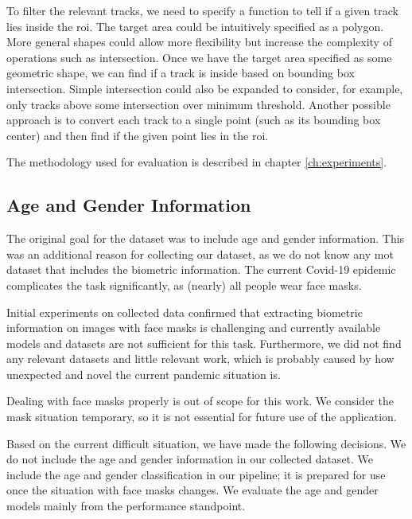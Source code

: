 To filter the relevant tracks, we need to specify a function to tell if a given track lies inside the \gls{roi}. The target area could be intuitively specified as a polygon. More general shapes could allow more flexibility but increase the complexity of operations such as intersection. Once we have the target area specified as some geometric shape, we can find if a track is inside based on bounding box intersection. Simple intersection could also be expanded to consider, for example, only tracks above some intersection over minimum threshold. Another possible approach is to convert each track to a single point (such as its bounding box center) and then find if the given point lies in the \gls{roi}.

The methodology used for evaluation is described in chapter \ref{ch:experiments}.

\subsection{Age and Gender Information}\label{s:dataset_age_and_gender}

The original goal for the dataset was to include age and gender information. This was an additional reason for collecting our dataset, as we do not know any \gls{mot} dataset that includes the biometric information. The current Covid-19 epidemic complicates the task significantly, as (nearly) all people wear face masks.

Initial experiments on collected data confirmed that extracting biometric information on images with face masks is challenging and currently available models and datasets are not sufficient for this task. Furthermore, we did not find any relevant datasets and little relevant work, which is probably caused by how unexpected and novel the current pandemic situation is.

Dealing with face masks properly is out of scope for this work. We consider the mask situation temporary, so it is not essential for future use of the application.

Based on the current difficult situation, we have made the following decisions. We do not include the age and gender information in our collected dataset. We include the age and gender classification in our pipeline; it is prepared for use once the situation with face masks changes. We evaluate the age and gender models mainly from the performance standpoint.

